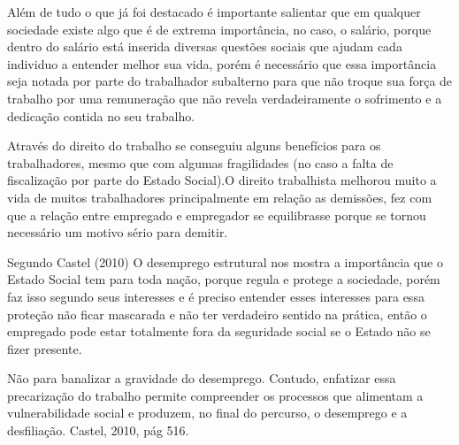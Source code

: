Além de tudo o que já foi destacado é importante salientar que em qualquer sociedade existe algo que é de extrema 
importância, no caso, o salário, porque dentro do salário está inserida diversas questões sociais que ajudam cada 
individuo a entender melhor sua vida, porém é necessário que essa importância seja notada por parte do trabalhador 
subalterno para que não troque sua força de trabalho por uma remuneração que não revela verdadeiramente o sofrimento 
e a dedicação contida no seu trabalho.

Através do direito do trabalho se conseguiu alguns benefícios para os trabalhadores, mesmo que com algumas 
fragilidades (no caso a falta de fiscalização por parte do Estado Social).O direito trabalhista melhorou muito
a vida de muitos trabalhadores principalmente em relação as demissões, fez com que a relação entre empregado e 
empregador se equilibrasse porque se tornou necessário um motivo sério para demitir.

Segundo Castel (2010) O desemprego estrutural nos mostra a importância que o Estado Social tem para toda nação,
porque regula e protege a sociedade, porém faz isso segundo seus interesses e é preciso entender esses interesses
para essa proteção não ficar mascarada e não ter verdadeiro sentido na prática, então o empregado pode estar 
totalmente fora da seguridade social se o Estado não se fizer presente.

\begin{citacao}
[…] Não para banalizar a gravidade do desemprego. Contudo, enfatizar essa precarização do trabalho permite 
compreender os processos que alimentam a vulnerabilidade social e produzem, no final do percurso, o desemprego 
e a desfiliação.  Castel, 2010, pág 516.
\end{citacao}

